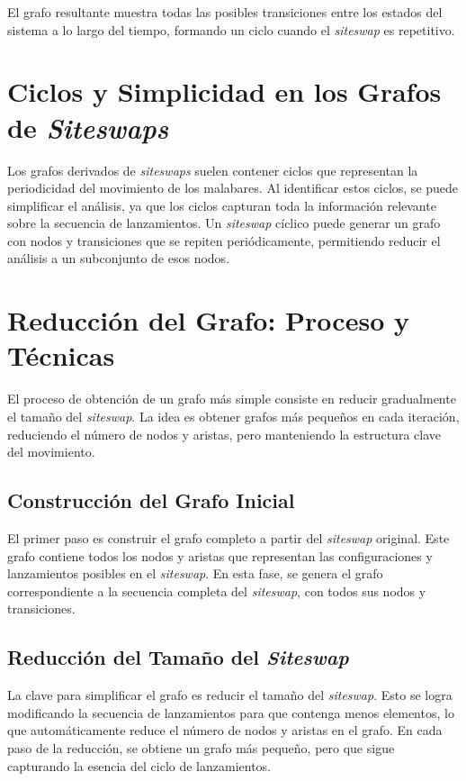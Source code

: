 \documentclass[a4paper,12pt]{article}
\begin{document}
El grafo resultante muestra todas las posibles transiciones entre los estados del sistema a lo largo del tiempo, formando un ciclo cuando el \emph{siteswap} es repetitivo.

\section{Ciclos y Simplicidad en los Grafos de \emph{Siteswaps}}

Los grafos derivados de \emph{siteswaps} suelen contener ciclos que representan la periodicidad del movimiento de los malabares. Al identificar estos ciclos, se puede simplificar el análisis, ya que los ciclos capturan toda la información relevante sobre la secuencia de lanzamientos. Un \emph{siteswap} cíclico puede generar un grafo con nodos y transiciones que se repiten periódicamente, permitiendo reducir el análisis a un subconjunto de esos nodos.

\section{Reducción del Grafo: Proceso y Técnicas}

El proceso de obtención de un grafo más simple consiste en reducir gradualmente el tamaño del \emph{siteswap}. La idea es obtener grafos más pequeños en cada iteración, reduciendo el número de nodos y aristas, pero manteniendo la estructura clave del movimiento.

\subsection{Construcción del Grafo Inicial}

El primer paso es construir el grafo completo a partir del \emph{siteswap} original. Este grafo contiene todos los nodos y aristas que representan las configuraciones y lanzamientos posibles en el \emph{siteswap}. En esta fase, se genera el grafo correspondiente a la secuencia completa del \emph{siteswap}, con todos sus nodos y transiciones.

\subsection{Reducción del Tamaño del \emph{Siteswap}}

La clave para simplificar el grafo es reducir el tamaño del \emph{siteswap}. Esto se logra modificando la secuencia de lanzamientos para que contenga menos elementos, lo que automáticamente reduce el número de nodos y aristas en el grafo. En cada paso de la reducción, se obtiene un grafo más pequeño, pero que sigue capturando la esencia del ciclo de lanzamientos. 
\end{document}
